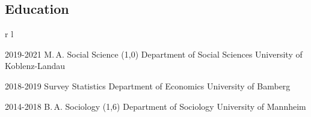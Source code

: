 \documentclass[10pt]{FreemanCV}
\begin{document}
\begin{paracol}{2}

\section{Education} 




\begin{supertabular}{r l} 


	\qualificationentry
		{2019-2021}
		{M.\,A. Social Science \textsc{(1,0)}}
		{} 
		{Department of Social Sciences}
		{University of Koblenz-Landau}

	\qualificationentry
		{2018-2019}
		{Survey Statistics}
		{} 
		{Department of Economics} 
		{University of Bamberg}

	\qualificationentry
		{2014-2018}
		{B.\,A. Sociology \textsc{(1,6)}}
		{} 
		{Department of Sociology}
		{University of Mannheim}


\end{supertabular}




	

\end{paracol}
\end{document}
